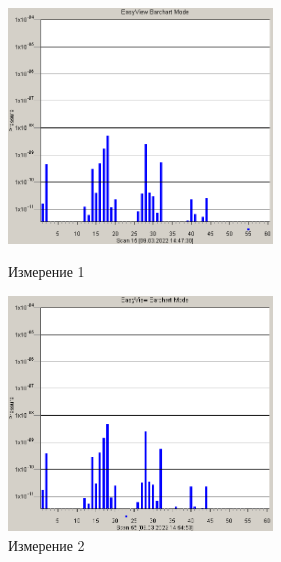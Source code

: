 \documentclass[a4paper,12pt]{article} %
\begin{document}
\begin{figure}[h]
\begin{center}
\begin{minipage}[h]{7cm}
\includegraphics[width=7cm]{spect_1.png}
\caption{Измерение 1} 
\label{spect1}
\end{minipage}
\hfill
\begin{minipage}[h]{7cm}
\includegraphics[width=7cm]{spect_2.png}
\caption{Измерение 2}
\label{spect2}
\end{minipage}
\end{center}
\end{figure}
\end{document}
